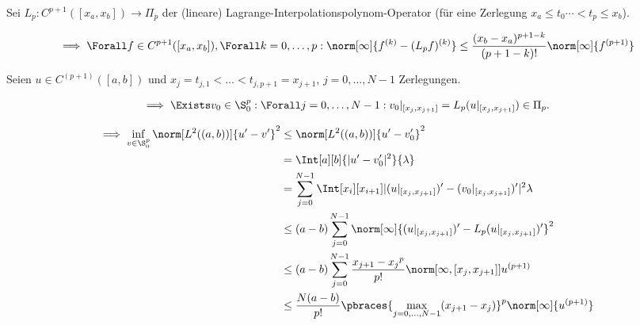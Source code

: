\begin{solution}

Sei $L_p: C^{p+1}([x_a, x_b]) \to \Pi_p$ der (lineare) Lagrange-Interpolationspolynom-Operator (für eine Zerlegung $x_a \leq t_0 \cdots < t_p \leq x_b$).


\begin{align*}
  \implies
  \Forall f \in C^{p+1}([x_a, x_b]),
  \Forall k = 0, \dots, p:
  \norm[\infty]
  {
    f^{(k)} - (L_p f)^{(k)}
  }
  \leq
  \frac
  {
    (x_b - x_a)^{p+1-k}
  }{
    (p + 1 - k)!
  }
  \norm[\infty]
  {
    f^{(p+1)}
  }
\end{align*}

Seien $u \in C^{(p+1)}([a, b])$ und $x_j = t_{j, 1} < \dots < t_{j, p+1} = x_{j+1}$, $j = 0, \dots, N-1$ Zerlegungen.

\begin{align*}
  \implies
  \Exists v_0 \in \S_0^p:
  \Forall j = 0, \dots, N-1:
  v_0|_{[x_j , x_{j+1}]}
  =
  L_p(u|_{[x_j , x_{j+1}]})
  \in
  \Pi_p.
\end{align*}

\begin{align*}
  \implies
  \inf_{v \in \S^p_0}
  \norm[L^2((a, b))]{u^\prime - v^\prime}^2
  & \leq
  \norm[L^2((a, b))]{u^\prime - v_0^\prime}^2 \\
  & =
  \Int[a][b]
  {|u^\prime - v_0^\prime|^2}
  {\lambda} \\
  & =
  \sum_{j=0}^{N-1}
  \Int[x_i][x_{i+1}]
  {
    |
      (u|_{[x_j , x_{j+1}]})^\prime
      -
      (v_0|_{[x_j , x_{j+1}]})^\prime
    |^2
  }
  {\lambda} \\
  & \leq
  (a - b)
  \sum_{j=0}^{N-1}
  \norm[\infty]
  {
    (u|_{[x_j , x_{j+1}]})^\prime
    -
    L_p(u|_{[x_j , x_{j+1}]})^\prime
  }^2 \\
  & \leq
  (a - b)
  \sum_{j=0}^{N-1}
  \frac
  {
    {x_{j+1} - x_j}^{p}
  }{p!}
  \norm
  [{\infty, [x_j,x_{j+1}]}]
  {u^{(p+1)}} \\
  & \leq
  \frac{N (a - b)}{p!}
  \pbraces
  {
    \max_{j=0, \dots, N-1}
    (x_{j+1} - x_j)
  }^p
  \norm[\infty]{u^{(p+1)}}
\end{align*}

\end{solution}

